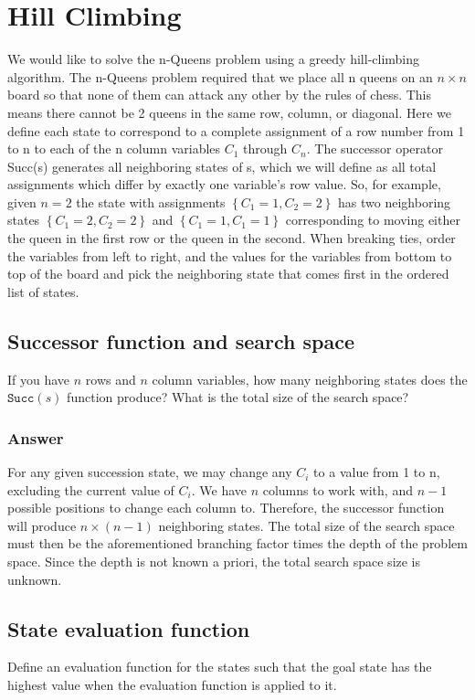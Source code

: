 \documentclass[12pt,letterpaper,titlepage]{article}
\begin{document}
\section[Question 2]{Hill Climbing}
\label{q2}
We would like to solve the n-Queens problem using a greedy hill-climbing algorithm. The n-Queens problem required that we place all n queens on an $n \times n$ board so that none of them can attack any other by the rules of chess. This means there cannot be 2 queens in the same row, column, or diagonal. Here we define each state to correspond to a complete assignment of a row number from 1 to n to each of the n column variables $C_1$ through $C_n$. The successor operator Succ(s) generates all neighboring states of s, which we will define as all total assignments which differ by exactly one variable's row value. So, for example, given $n=2$ the state with assignments $\left\lbrace C_1=1,C_2=2\right\rbrace$ has two neighboring states $\left\lbrace C_1=2,C_2=2\right\rbrace$ and $\left\lbrace C_1=1,C_1=1\right\rbrace$ corresponding to moving either the queen in the first row or the queen in the second. When breaking ties, order the variables from left to right, and the values for the variables from bottom to top of the board and pick the neighboring state that comes first in the ordered list of states.
\subsection[Part 1]{Successor function and search space}
If you have $n$ rows and $n$ column variables, how many neighboring states does the $\texttt{Succ}\left(s\right)$ function produce? What is the total size of the search space?
\subsubsection{Answer}
For any given succession state, we may change any $C_i$ to a value from 1 to n, excluding the current value of $C_i$. We have $n$ columns to work with, and $n-1$ possible positions to change each column to. Therefore, the successor function will produce $n\times\left(n-1\right)$ neighboring states. The total size of the search space must then be the aforementioned branching factor times the depth of the problem space. Since the depth is not known a priori, the total search space size is unknown.
\label{2part1}
\subsection[Part 2]{State evaluation function}
Define an evaluation function for the states such that the goal state has the highest value when the evaluation function is applied to it.
\end{document}
